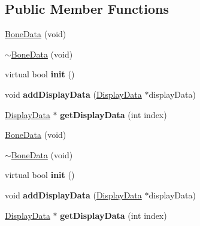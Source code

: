 \subsection*{Public Member Functions}
\begin{DoxyCompactItemize}
\item 
\hyperlink{classcocostudio_1_1BoneData_a705f6ec4ccefdd1fbc5474b22cfb6c1f}{Bone\+Data} (void)
\item 
\hyperlink{classcocostudio_1_1BoneData_afbfe49c55c3e2a02c283ce9a896eb49e}{$\sim$\+Bone\+Data} (void)
\item 
\mbox{\label{classcocostudio_1_1BoneData_af57fa5b0a7fe914e3a31962e46a7f286}} 
virtual bool {\bfseries init} ()
\item 
\mbox{\label{classcocostudio_1_1BoneData_a0147db22e6f2fe40c8a75e57a36f49a1}} 
void {\bfseries add\+Display\+Data} (\hyperlink{classcocostudio_1_1DisplayData}{Display\+Data} $\ast$display\+Data)
\item 
\mbox{\label{classcocostudio_1_1BoneData_a284a712c38c3f1cc4e7b81f9bf2afaf1}} 
\hyperlink{classcocostudio_1_1DisplayData}{Display\+Data} $\ast$ {\bfseries get\+Display\+Data} (int index)
\item 
\hyperlink{classcocostudio_1_1BoneData_a705f6ec4ccefdd1fbc5474b22cfb6c1f}{Bone\+Data} (void)
\item 
\hyperlink{classcocostudio_1_1BoneData_afbfe49c55c3e2a02c283ce9a896eb49e}{$\sim$\+Bone\+Data} (void)
\item 
\mbox{\label{classcocostudio_1_1BoneData_a236939041698dc1f485ff552e0fbe911}} 
virtual bool {\bfseries init} ()
\item 
\mbox{\label{classcocostudio_1_1BoneData_a0147db22e6f2fe40c8a75e57a36f49a1}} 
void {\bfseries add\+Display\+Data} (\hyperlink{classcocostudio_1_1DisplayData}{Display\+Data} $\ast$display\+Data)
\item 
\mbox{\label{classcocostudio_1_1BoneData_a20939618112c8135ee01f9bf20307b2c}} 
\hyperlink{classcocostudio_1_1DisplayData}{Display\+Data} $\ast$ {\bfseries get\+Display\+Data} (int index)
\end{DoxyCompactItemize}

